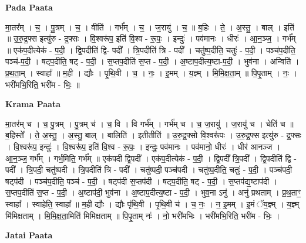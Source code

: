 \documentclass[17pt]{extarticle}
\begin{document}
\textbf{Pada Paata} \newline

मा॒तर᳚म् । च॒ । पु॒त्रम् । च॒ । वीति॑ । गर्भ᳚म् । च॒ । ज॒रायु॑ । च॒ ॥ ब॒हिः । ते॒ । अ॒स्तु॒ । बाल् । इति॑ ॥ उ॒रु॒द्र॒फ्स इत्यु॑रु - द्र॒फ्सः । वि॒श्वरू॑प॒ इति॑ वि॒श्व - रू॒पः॒ । इन्दुः॑ । पव॑मानः । धीरः॑ । आ॒न॒ञ्ज॒ । गर्भ᳚म् ॥ एक॑प॒दीत्येक॑ - प॒दी॒ । द्वि॒पदीति॑ द्वि- पदी᳚ । त्रि॒पदीति॑ त्रि - पदी᳚ । चतु॑ष्प॒दीति॒ चतुः॑ - प॒दी॒ । पञ्च॑प॒दीति॒ पञ्च॑-प॒दी॒ । षट्प॒दीति॒ षट् - प॒दी॒ । स॒प्तप॒दीति॑ स॒प्त - प॒दी॒ । अ॒ष्टाप॒दीत्य॒ष्टा-प॒दी॒ । भुव॑ना । अन्विति॑ । प्र॒थ॒ता॒म् । स्वाहा᳚ ॥ म॒ही । द्यौः । पृ॒थि॒वी । च॒ । नः॒ । इ॒मम् । य॒ज्ञ्म् । मि॒मि॒क्ष॒ता॒म् ॥ पि॒पृ॒ताम् । नः॒ । भरी॑मभि॒रिति॒ भरी॑म - भिः॒ ॥  \newline


\textbf{Krama Paata} \newline

मा॒तर॑म् च । च॒ पु॒त्रम् । पु॒त्रम् च॑ । च॒ वि । वि गर्भ᳚म् । गर्भ॑म् च । च॒ ज॒रायु॑ । ज॒रायु॑ च । चेति॑ च ॥ ब॒हिस्ते᳚ । ते॒ अ॒स्तु॒ । अ॒स्तु॒ बाल् । बालिति॑ । इतीतीति॑ ॥ उ॒रु॒द्र॒फ्सो वि॒श्वरू॑पः । उ॒रु॒द्र॒फ्स इत्यु॑रु - द्र॒फ्सः । वि॒श्वरू॑प॒ इन्दुः॑ । वि॒श्वरू॑प॒ इति॑ वि॒श्व - रू॒पः॒ । इन्दुः॒ पव॑मानः । पव॑मानो॒ धीरः॑ । धीर॑ आनञ्ज । आ॒न॒ञ्ज॒ गर्भ᳚म् । गर्भ॒मिति॒ गर्भ᳚म् ॥ एक॑पदी द्वि॒पदी᳚ । एक॑प॒दीत्येक॑ - प॒दी॒ । द्वि॒पदी᳚ त्रि॒पदी᳚ । द्वि॒पदीति॑ द्वि - पदी᳚ । त्रि॒पदी॒ चतु॑ष्पदी । त्रि॒पदीति॑ त्रि - पदी᳚ । चतु॑ष्पदी॒ पञ्च॑पदी । चतु॑ष्प॒दीति॒ चतुः॑ - प॒दी॒ । पञ्च॑पदी॒ षट्प॑दी । पञ्च॑प॒दीति॒ पञ्च॑ - प॒दी॒ । षट्प॑दी स॒प्तप॑दी । षट्प॒दीति॒ षट् - प॒दी॒ । स॒प्तप॑द्य॒ष्टाप॑दी । स॒प्तप॒दीति॑ स॒प्त - प॒दी॒ । अ॒ष्टाप॑दी॒ भुव॑ना । अ॒ष्टाप॒दीत्य॒ष्टा - प॒दी॒ । भुव॒ना ऽनु॑ । अनु॑ प्रथताम् । प्र॒थ॒ताꣳ॒॒ स्वाहा᳚ । स्वाहेति॒ स्वाहा᳚ ॥ म॒ही द्यौः । द्यौः पृ॑थि॒वी । पृ॒थि॒वी च॑ । च॒ नः॒ । न॒ इ॒मम् । इ॒मं ॅय॒ज्ञ्म् । य॒ज्ञ्म् मि॑मिक्षताम् । मि॒मि॒क्ष॒ता॒मिति॑ मिमिक्षताम् ॥ पि॒पृ॒ताम् नः॑ । नो॒ भरी॑मभिः । भरी॑मभि॒रिति॒ भरी॑म - भिः॒ । \newline

\textbf{Jatai Paata} \newline
\end{document}
